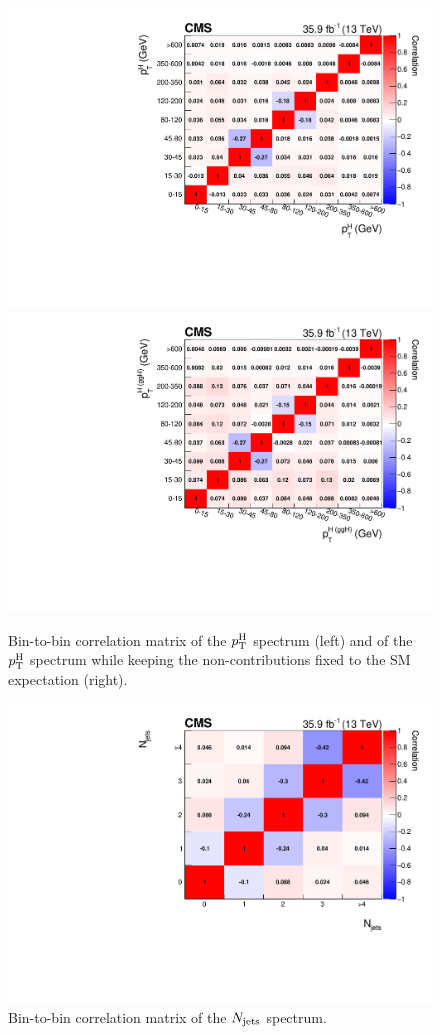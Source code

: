 \begin{figure}[hbtp]
  \begin{center}
    \includegraphics[width=0.49\linewidth]{img/differentials/appendix/corrmat_pth_smH.pdf}
    \includegraphics[width=0.49\linewidth]{img/differentials/appendix/corrmat_pth_ggH.pdf}
    \caption{
         Bin-to-bin correlation matrix of the $p_\mathrm{T}^\mathrm{H}$ spectrum (left) and of the $p_\mathrm{T}^\mathrm{H}$ spectrum while keeping the non-\ggh contributions fixed to the SM expectation (right).
        }
    \label{fig:corrMat_pth}
  \end{center}
\end{figure}

\begin{figure}[hbtp]
  \begin{center}
    \includegraphics[width=0.49\linewidth]{img/differentials/appendix/corrmat_njets.pdf}
    \caption{
        Bin-to-bin correlation matrix of the $N_\text{jets} $ spectrum.
        }
    \label{fig:corrMat_njets}
  \end{center}
\end{figure}

